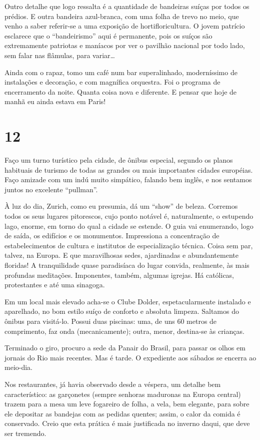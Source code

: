 Outro detalhe que logo ressalta é a quantidade de bandeiras suíças por todos os prédios. E outra bandeira azul-branca, com uma folha de trevo no meio, que venho a saber referir-se a uma exposição de hortifloricultura. O jovem patrício esclarece que o ``bandeirismo'' aqui é permanente, pois os suíços são extremamente patriotas e maníacos por ver o pavilhão nacional por todo lado, sem falar nas flâmulas, para variar\ldots

Ainda com o rapaz, tomo um café num bar superalinhado, moderníssimo de instalações e decoração, e com magnífica orquestra. Foi o programa de encerramento da noite. Quanta coisa nova e diferente. E pensar que hoje de manhã eu ainda estava em Paris!

\section*{12 \adfflatleafright {}}
Faço um turno turístico pela cidade, de ônibus especial, segundo os planos habituais de turismo de todas as grandes ou mais importantes cidades européias. Faço amizade com um indú muito simpático, falando bem inglês, e nos sentamos juntos no excelente ``pullman''.

À luz do dia, Zurich, como eu presumia, dá um ``show'' de beleza. Corremos todos os seus lugares pitorescos, cujo ponto notável é, naturalmente, o estupendo lago, enorme, em torno do qual a cidade se estende. O guia vai enumerando, logo de saída, os edifícios e os monumentos. Impressiona a concentração de estabelecimentos de cultura e institutos de especialização técnica. Coisa sem par, talvez, na Europa. E que maravilhosas sedes, ajardinadas e abundantemente floridas! A tranquilidade quase paradisíaca do lugar convida, realmente, às mais profundas meditações. Imponentes, também, algumas igrejas. Há católicas, protestantes e até uma sinagoga.

Em um local mais elevado acha-se o Clube Dolder, espetacularmente instalado e aparelhado, no bom estilo suíço de conforto e absoluta limpeza. Saltamos do ônibus para visitá-lo. Possui duas piscinas: uma, de uns 60 metros de comprimento, faz onda (mecanicamente); outra, menor, destina-se às crianças.

Terminado o giro, procuro a sede da Panair do Brasil, para passar os olhos em jornais do Rio mais recentes. Mas é tarde. O expediente aos sábados se encerra ao meio-dia.

Nos restaurantes, já havia observado desde a véspera, um detalhe bem característico: as garçonetes (sempre senhoras maduronas na Europa central) trazem para a mesa um leve fogareiro de folha, a vela, bem elegante, para sobre ele depositar as bandejas com as pedidas quentes; assim, o calor da comida é conservado. Creio que esta prática é mais justificada no inverno daqui, que deve ser tremendo.


